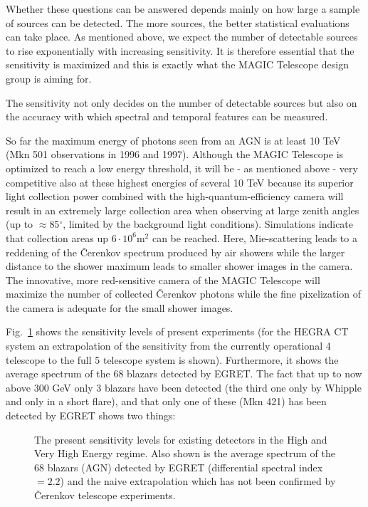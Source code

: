 Whether these questions can be answered depends mainly on how large a sample
of sources can be detected. The more sources, the better statistical
evaluations can take place. As mentioned above, we expect the number of
detectable sources to rise exponentially with increasing sensitivity. It is
therefore essential that the sensitivity is maximized and this is exactly
what the MAGIC Telescope design group is aiming for.

The sensitivity not only decides on the number of detectable sources but
also on the accuracy with which spectral and temporal features can be
measured.

So far the maximum energy of photons seen from an AGN is at least 10 TeV
(Mkn 501 observations in 1996 and 1997). Although the MAGIC Telescope is
optimized to reach a low energy threshold, it will be - as mentioned above -
very competitive also at these highest energies of several 10 TeV because
its superior light collection power combined with the
high-quantum-efficiency camera will result in an extremely large collection
area when observing at large zenith angles (up to $\approx $85$^{\circ }$,
limited by the background light conditions). Simulations indicate that collection
areas up $6 \cdot 10^6$\thinspace m$^{2}$ can be reached. Here, Mie-scattering
leads to a reddening of the \v{C}erenkov spectrum produced by air showers
while the larger distance to the shower maximum leads to smaller shower
images in the camera. The innovative, more red-sensitive camera of the MAGIC
Telescope will maximize the number of collected \v{C}erenkov photons while
the fine pixelization of the camera is adequate for the small shower images.

Fig.~\ref{fig-presentsens} shows the sensitivity levels of present
experiments (for the HEGRA CT system an extrapolation of the 
sensitivity from the currently operational 4 telescope to the full 5 telescope system
is shown). 
Furthermore, it shows the average spectrum of the 68 blazars
detected by EGRET. The fact that up to now above 300 GeV only 3 blazars have
been detected (the third one only by Whipple and only in a short flare), and
that only one of these (Mkn 421) has been detected by EGRET shows two things:

\begin{figure} \centering \leavevmode
\epsfxsize=14cm
\caption{\label{fig-presentsens}
The present sensitivity levels for existing detectors in the High and Very
High Energy
regime. Also shown is the average spectrum of the 68 blazars (AGN) detected
by EGRET
(differential spectral index $= 2.2$) and the naive extrapolation which has
not been
confirmed by \v{C}erenkov telescope experiments.}
\end{figure}

